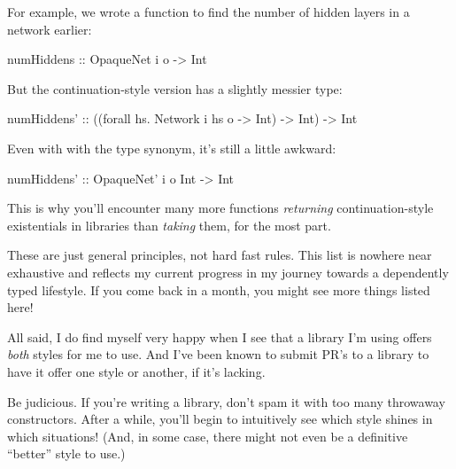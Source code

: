\documentclass[]{article}
\newenvironment{Shaded}{\begin{snugshade}}{\end{snugshade}}
\newcommand{\DataTypeTok}[1]{\textcolor[rgb]{0.13,0.29,0.53}{#1}}
\newcommand{\FunctionTok}[1]{\textcolor[rgb]{0.00,0.00,0.00}{#1}}
\newcommand{\NormalTok}[1]{#1}
\newcommand{\OtherTok}[1]{\textcolor[rgb]{0.56,0.35,0.01}{#1}}
\begin{document}
\begin{itemize}
  For example, we wrote a function to find the number of hidden layers in a
  network earlier:

\begin{Shaded}
\begin{Highlighting}[]
\OtherTok{numHiddens ::} \DataTypeTok{OpaqueNet}\NormalTok{ i o }\OtherTok{->} \DataTypeTok{Int}
\end{Highlighting}
\end{Shaded}

  But the continuation-style version has a slightly messier type:

\begin{Shaded}
\begin{Highlighting}[]
\OtherTok{numHiddens' ::}\NormalTok{ ((forall hs}\FunctionTok{.} \DataTypeTok{Network}\NormalTok{ i hs o }\OtherTok{->} \DataTypeTok{Int}\NormalTok{) }\OtherTok{->} \DataTypeTok{Int}\NormalTok{)}
            \OtherTok{->} \DataTypeTok{Int}
\end{Highlighting}
\end{Shaded}

  Even with with the type synonym, it's still a little awkward:

\begin{Shaded}
\begin{Highlighting}[]
\OtherTok{numHiddens' ::} \DataTypeTok{OpaqueNet'}\NormalTok{ i o }\DataTypeTok{Int} \OtherTok{->} \DataTypeTok{Int}
\end{Highlighting}
\end{Shaded}

  This is why you'll encounter many more functions \emph{returning}
  continuation-style existentials in libraries than \emph{taking} them, for the
  most part.
\end{itemize}

These are just general principles, not hard fast rules. This list is nowhere
near exhaustive and reflects my current progress in my journey towards a
dependently typed lifestyle. If you come back in a month, you might see more
things listed here!

All said, I do find myself very happy when I see that a library I'm using offers
\emph{both} styles for me to use. And I've been known to submit PR's to a
library to have it offer one style or another, if it's lacking.

Be judicious. If you're writing a library, don't spam it with too many throwaway
constructors. After a while, you'll begin to intuitively see which style shines
in which situations! (And, in some case, there might not even be a definitive
``better'' style to use.)
\end{document}
